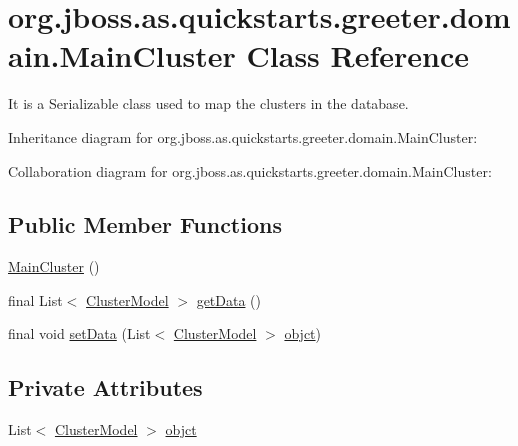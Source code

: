 \hypertarget{classorg_1_1jboss_1_1as_1_1quickstarts_1_1greeter_1_1domain_1_1_main_cluster}{}\section{org.\+jboss.\+as.\+quickstarts.\+greeter.\+domain.\+Main\+Cluster Class Reference}
\label{classorg_1_1jboss_1_1as_1_1quickstarts_1_1greeter_1_1domain_1_1_main_cluster}


It is a Serializable class used to map the clusters in the database.  




Inheritance diagram for org.\+jboss.\+as.\+quickstarts.\+greeter.\+domain.\+Main\+Cluster\+:


Collaboration diagram for org.\+jboss.\+as.\+quickstarts.\+greeter.\+domain.\+Main\+Cluster\+:
\subsection*{Public Member Functions}
\begin{DoxyCompactItemize}
\item 
\hyperlink{classorg_1_1jboss_1_1as_1_1quickstarts_1_1greeter_1_1domain_1_1_main_cluster_aa935625c3b4c22900c39842ddaa6c2ec}{Main\+Cluster} ()
\item 
final List$<$ \hyperlink{classorg_1_1jboss_1_1as_1_1quickstarts_1_1greeter_1_1domain_1_1_cluster_model}{Cluster\+Model} $>$ \hyperlink{classorg_1_1jboss_1_1as_1_1quickstarts_1_1greeter_1_1domain_1_1_main_cluster_a2058025d6f351cde2c854465a64e695c}{get\+Data} ()
\item 
final void \hyperlink{classorg_1_1jboss_1_1as_1_1quickstarts_1_1greeter_1_1domain_1_1_main_cluster_a6bc1db0c250102d3bf3844275d4938e1}{set\+Data} (List$<$ \hyperlink{classorg_1_1jboss_1_1as_1_1quickstarts_1_1greeter_1_1domain_1_1_cluster_model}{Cluster\+Model} $>$ \hyperlink{classorg_1_1jboss_1_1as_1_1quickstarts_1_1greeter_1_1domain_1_1_main_cluster_a4c502c63f5bf73b0e514bf9f302844ff}{objct})
\end{DoxyCompactItemize}
\subsection*{Private Attributes}
\begin{DoxyCompactItemize}
\item 
List$<$ \hyperlink{classorg_1_1jboss_1_1as_1_1quickstarts_1_1greeter_1_1domain_1_1_cluster_model}{Cluster\+Model} $>$ \hyperlink{classorg_1_1jboss_1_1as_1_1quickstarts_1_1greeter_1_1domain_1_1_main_cluster_a4c502c63f5bf73b0e514bf9f302844ff}{objct}
\end{DoxyCompactItemize}
